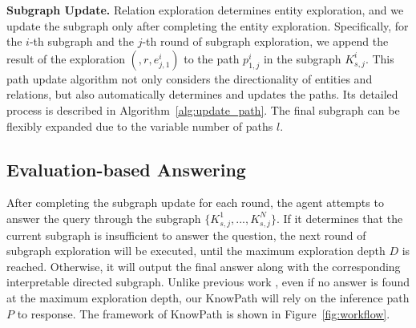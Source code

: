 \textbf{Subgraph Update.}
Relation exploration determines entity exploration, and we update the subgraph only after completing the entity exploration.
Specifically, for the $i$-th subgraph and the $j$-th round of subgraph exploration, we append the result of the exploration $( , r, e_{j,1}^i)$ to the path $p_{1,j}^i$ in the subgraph $K_{s,j}^i$.
This path update algorithm not only considers the directionality of entities and relations, but also automatically determines and updates the paths.
Its detailed process is described in Algorithm~\ref{alg:update_path}.
The final subgraph can be flexibly expanded due to the variable number of paths $l$.




\subsection{Evaluation-based Answering}

After completing the subgraph update for each round, the agent attempts to answer the query through the subgraph $\{K_{s,j}^1, ..., K_{s,j}^N \}$.
If it determines that the current subgraph is insufficient to answer the question, the next round of subgraph exploration will be executed, until the maximum exploration depth $D$ is reached.
Otherwise, it will output the final answer along with the corresponding interpretable directed subgraph.
Unlike previous work \cite{pog}, even if no answer is found at the maximum exploration depth, our KnowPath will rely on the inference path $P$ to response.
The framework of KnowPath is shown in Figure~\ref{fig:workflow}.
